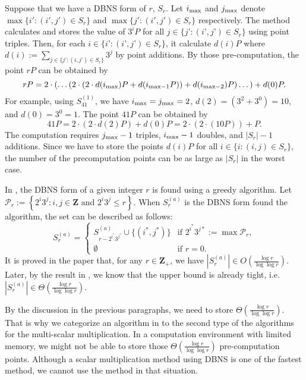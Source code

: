 Suppose that we have a DBNS form of $r$, $S_r$. Let $i_{\rm max}$ and $j_{\rm max}$ denote $\max\{ i' : (i',j') \in S_r \}$ and $\max\{ j' : (i',j') \in S_r \}$ respectively. The method calculates and stores the value of $3^iP$ for all $j \in \{j’ : (i’, j’) \in S_r \}$ using point triples. Then, for each $i \in \{i’ : (i’, j’) \in S_r \}$, it calculate $d(i)P$ where $d(i) := \sum\limits_{j \in \{j’ : (i,j’) \in S_r\}} 3^j $ by point additions. By those pre-computation, the point $rP$ can be obtained by
$$rP = 2\cdot \left( \dots \left( 2 \cdot \left( 2 \cdot d(i_{\rm max})P + d(i_{\mathrm{max} - 1}P) \right) + d(i_{\mathrm{max} - 2})P \right) \dots \right) + d(0)P.$$
For example, using $S_{41}^{(1)}$, we have $i_{\rm max} = j_{\rm max} = 2$, $d(2) = \left(3^2 + 3^0\right) = 10$, and $d(0) =  3^0 = 1$. The point $41P$ can be obtained by
$$41P = 2 \cdot \left( 2 \cdot d(2)P  \right) + d(0)P = 2 \cdot \left( 2 \cdot \left( 10P \right)  \right) + P.$$
The computation requires $j_{\rm max} - 1$ triples, $i_{\rm max} - 1$ doubles, and $|S_r| - 1$ additions. Since we have to store the points $d(i)P$ for all $i \in \{i : (i,j) \in S_r\}$, the number of the precomputation points can be as large as $|S_r|$ in the worst case.

In \cite{dbns2}, the DBNS form of a given integer $r$ is found using a greedy algorithm. Let $\mathcal{P}_r := \left\{ 2^i3^j : i,j \in \mathbf{Z} \text{ and } 2^i3^j \leq r \right\}$. When $S^{(a)}_r$ is the DBNS form found the algorithm, the set can be described as follows:
\[
S^{(a)}_r =
\begin{cases}
S^{(a)}_{r - 2^{i^*}3^{j^*}} \cup \{(i^*, j^*)\} & \text{if } 2^{i^*}3^{j*} := \max \mathcal{P}_r, \\
\emptyset       & \text{if } r = 0.
\end{cases}
\]
It is proved in the paper that, for any $r \in \mathbf{Z}_+$, we have $\left|S_r^{(a)}\right| \in O(\frac{\log r}{\log \log r})$. Later, by the result in \cite{dbns3}, we know that the upper bound is already tight, i.e. $\left|S_r^{(a)}\right| \in \Theta(\frac{\log r}{\log \log r})$.

By the discussion in the previous paragraphs, we need to store $\Theta(\frac{\log r}{\log \log r})$. That is why we categorize an algorithm in \cite{dbns} to the second type of the algorithms for the multi-scalar multiplication. In a computation environment with limited memory, we might not be able to store those $\Theta(\frac{\log r}{\log \log r})$ pre-computation points. Although a scalar multiplication method using DBNS is one of the fastest method, we cannot use the method in that situation.

